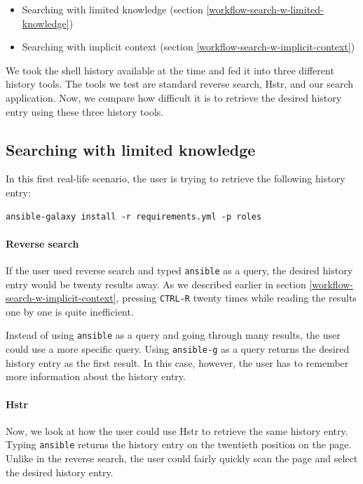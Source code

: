 \begin{itemize}
\item Searching with limited knowledge (section \ref{workflow-search-w-limited-knowledge})
\item Searching with implicit context (section \ref{workflow-search-w-implicit-context})
\end{itemize}
We took the shell history available at the time and fed it into three different history tools. The tools we test are standard reverse search, Hstr, and our search application. Now, we compare how difficult it is to retrieve the desired history entry using these three history tools.

\subsection{Searching with limited knowledge}

In this first real-life scenario, the user is trying to retrieve the following history entry: 

\begin{verbatim}
ansible-galaxy install -r requirements.yml -p roles
\end{verbatim}

\paragraph{Reverse search}
If the user used reverse search and typed \verb|ansible| as a query, the desired history entry would be twenty results away. As we described earlier in section \ref{workflow-search-w-implicit-context}, pressing \verb|CTRL-R| twenty times while reading the results one by one is quite inefficient.

Instead of using \verb|ansible| as a query and going through many results, the user could use a more specific query. Using \verb|ansible-g| as a query returns the desired history entry as the first result. In this case, however, the user has to remember more information about the history entry.

\paragraph{Hstr}
Now, we look at how the user could use Hstr to retrieve the same history entry.
Typing \verb|ansible| returns the history entry on the twentieth position on the page. Unlike in the reverse search, the user could fairly quickly scan the page and select the desired history entry. 


